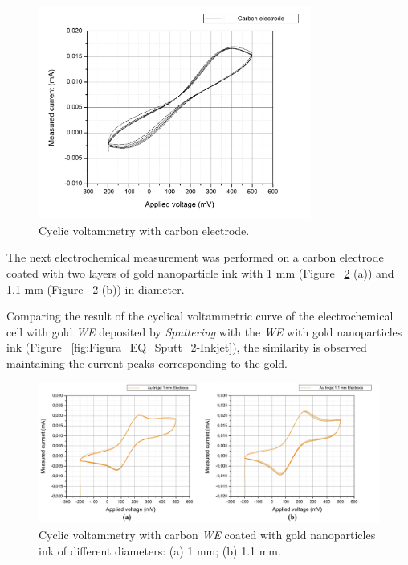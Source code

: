 \begin{figure}[H]
  \centering
    \includegraphics[width=0.8\textwidth]{Figures/Figura_EQ_Carbono}
  \caption{Cyclic voltammetry with carbon electrode.}
  \label{fig:Figura_EQ_Carbono}
\end{figure}
The next electrochemical measurement was performed on a carbon electrode coated with two layers of gold nanoparticle ink with 1 mm (Figure ~\ref{fig:Figura_EQ_Oro_Inkjet_Ambos} (a)) and 1.1 mm (Figure ~\ref{fig:Figura_EQ_Oro_Inkjet_Ambos} (b)) in diameter.

Comparing the result of the cyclical voltammetric curve of the electrochemical cell with gold \emph{WE} deposited by \textit{Sputtering} with the \emph{WE} with gold nanoparticles ink (Figure ~\ref{fig:Figura_EQ_Sputt_2-Inkjet}), the similarity is observed maintaining the current peaks corresponding to the gold.

\begin{figure}[H]
  \centering
    \includegraphics[width=1\textwidth]{Figures/Figura_EQ_Oro_Inkjet_Ambos}
  \caption{Cyclic voltammetry with carbon \emph{WE} coated with gold nanoparticles ink of different diameters: (a) 1 mm; (b) 1.1 mm.}
  \label{fig:Figura_EQ_Oro_Inkjet_Ambos}
\end{figure}

